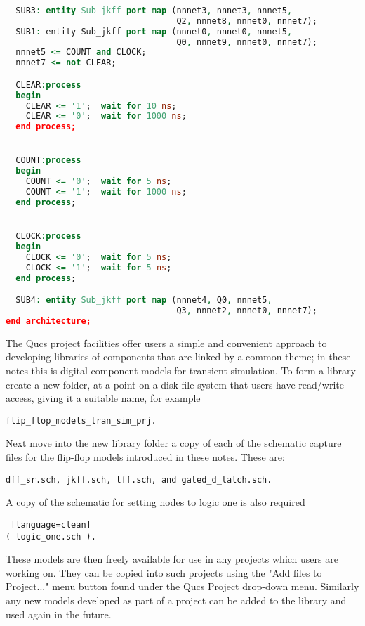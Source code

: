 \begin{lstlisting}[language=VHDL,
    caption={VHDL testbench code for the circuit shown in Fig.~\ref{fig:fig13}},
    label={lst:lst1}]
  
  SUB3: entity Sub_jkff port map (nnnet3, nnnet3, nnnet5, 
                                  Q2, nnnet8, nnnet0, nnnet7);
  SUB1: entity Sub_jkff port map (nnnet0, nnnet0, nnnet5, 
                                  Q0, nnnet9, nnnet0, nnnet7);
  nnnet5 <= COUNT and CLOCK;
  nnnet7 <= not CLEAR;

  CLEAR:process
  begin
    CLEAR <= '1';  wait for 10 ns;
    CLEAR <= '0';  wait for 1000 ns;
  end process;


  COUNT:process
  begin
    COUNT <= '0';  wait for 5 ns;
    COUNT <= '1';  wait for 1000 ns;
  end process;


  CLOCK:process
  begin
    CLOCK <= '0';  wait for 5 ns;
    CLOCK <= '1';  wait for 5 ns;
  end process;

  SUB4: entity Sub_jkff port map (nnnet4, Q0, nnnet5, 
                                  Q3, nnnet2, nnnet0, nnnet7);
end architecture;
\end{lstlisting}


The Qucs project facilities offer users a simple and convenient
approach to developing libraries of components that are linked by a
common theme; in these notes this is digital component models for
transient simulation. To form a library create a new folder, at a
point on a disk file system that users have read/write access, giving
it a suitable name, for example
\begin{lstlisting}[language=clean] 
 flip_flop_models_tran_sim_prj. 
\end{lstlisting}  
Next move into the new library folder a copy of each of the schematic
capture files for the flip-flop models introduced in these notes.
These are:
\begin{lstlisting}[language=clean]
dff_sr.sch, jkff.sch, tff.sch, and gated_d_latch.sch.
\end{lstlisting} 

A copy of the schematic for setting nodes to logic one is also required 
\begin{lstlisting} [language=clean] 
( logic_one.sch ). 
\end{lstlisting}

These models are then freely available for use in any projects which
users are working on.  They can be copied into such projects using the
"Add files to Project..." menu button found under the Qucs Project
drop-down menu. Similarly any new models developed as part of a
project can be added to the library and used again in the future.

